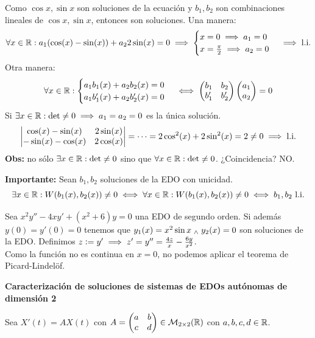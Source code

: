 Como $\cos{x}, \sin{x}$ son soluciones de la ecuación y $b_1, b_2$ son combinaciones lineales de $\cos{x}, \sin{x}$, entonces son soluciones.
Una manera: \[\forall x \in \mathbb{R} : a_1(\cos(x) - \sin(x)) + a_2 2 \sin(x) = 0 \implies \begin{cases}
		x= 0 \implies a_1 = 0 \\
		x= \frac{\pi}{2} \implies a_2 = 0
	\end{cases}\implies \text{l.i.}\]
Otra manera:
\[\forall x \in \mathbb{R} : \begin{cases}
		a_1b_1(x) + a_2b_2(x) = 0 \\
		a_1b_1'(x) + a_2b_2'(x) = 0
	\end{cases} \iff \begin{pmatrix}
		b_1  & b_2  \\
		b_1' & b_2'
	\end{pmatrix} \begin{pmatrix}
		a_1 \\
		a_2
	\end{pmatrix} = 0\]
Si $\exists x \in \mathbb{R} : \det \neq 0 \implies a_1 = a_2 = 0$ es la única solución.
\[\begin{vmatrix}
		\cos(x) - \sin(x)  & 2\sin(x) \\
		-\sin(x) - \cos(x) & 2\cos(x)
	\end{vmatrix} = \cdots = 2\cos^2(x) + 2\sin^2(x) = 2 \neq 0 \implies \text{l.i.}\]
\textbf{Obs:} no sólo $\exists x\in \mathbb{R} : \det \neq 0$ sino que $\forall x \in \mathbb{R} : \det \neq 0$. ¿Coincidencia? NO.

\textbf{Importante:} Sean $b_1, b_2$ soluciones de la EDO con unicidad.
\[\exists x \in \mathbb{R} : W(b_1(x), b_2(x)) \neq 0 \iff \forall x \in \mathbb{R} : W(b_1(x), b_2(x)) \neq 0 \iff b_1, b_2 \text{ l.i.}\]

Sea $x^2y'' - 4xy'+(x^2+6)y = 0$ una EDO de segundo orden. Si además $y(0) = y'(0) = 0$ tenemos que $y_1(x)=x^2\sin{x} \; _{\wedge} \; y_2(x)= 0$ son soluciones de la EDO. Definimos $z\vcentcolon= y' \implies z' = y'' = \frac{4z}{x} - \frac{6y}{x^2}$.\\

Como la función no es continua en $x=0$, no podemos aplicar el teorema de Picard-Lindelöf.


\textbf{Caracterización de soluciones de sistemas de EDOs autónomas de dimensión 2}

Sea $X'(t) = A X(t)$ con $A =\begin{pmatrix}
		a & b \\
		c & d
	\end{pmatrix} \in \mathcal{M}_{2\times 2}(\mathbb{R})$ con $a,b,c,d \in \mathbb{R}$.

